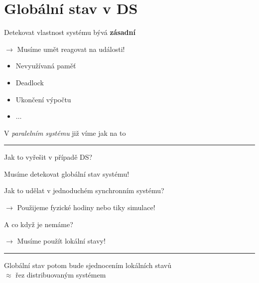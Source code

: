 \documentclass[usenames,dvipsnames,9pt]{beamer}
\begin{document}
\section{Globální stav v DS}

\begin{frame}
Detekovat vlastnost systému bývá {\bf zásadní}

\hfill $\rightarrow$ Musíme umět reagovat na události!

\vspace{2em}
\begin{itemize}
\item Nevyužívaná paměť
\item Deadlock
\item Ukončení výpočtu
\item $\dots$
\end{itemize}

\vspace{2em}

V \emph{paralelním systému} již víme jak na to

 \pause\vspace{2em}\hrule\vspace{2em}

  \begin{center}
    \LARGE Jak to vyřešit v případě DS?
  \end{center}
\end{frame}

\begin{frame}
  \begin{center}
    \LARGE Musíme detekovat globální stav systému!
  \end{center}

  \vspace{2em}

  Jak to udělat v jednoduchém synchronním systému?

  \pause\hfill $\rightarrow$ Použijeme fyzické hodiny nebo tiky simulace!

A co když je nemáme?

    \pause\hfill $\rightarrow$ Musíme použít lokální stavy!

      \vspace{2em}\hrule\vspace{2em}

      \begin{center}
    \LARGE Globální stav potom bude sjednocením lokálních stavů\\ $\approx$  řez distribuovaným systémem
  \end{center}

\end{frame}
\end{document}
